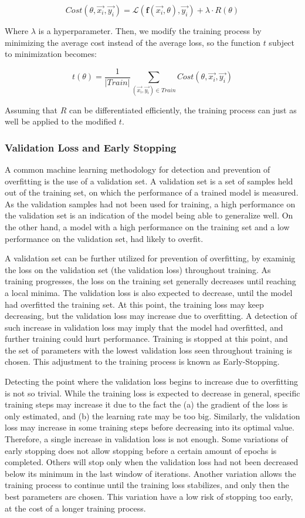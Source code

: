 $$ Cost(\theta, \vec{x_i}, \vec{y_i}) = \mathcal{L}(\textbf{f}(\vec{x_i}, \theta), \vec{y_i}) + \lambda \cdot R(\theta) $$

Where $\lambda$ is a hyperparameter. Then, we modify the training process by minimizing the average cost instead of the average loss, so the function $t$ subject to minimization becomes:

$$ t(\theta) = \frac{1}{|Train|}\sum_{(\vec{x_i}, \vec{y_i}) \in Train} Cost(\theta, \vec{x_i}, \vec{y_i}) $$

Assuming that $R$ can be differentiated efficiently, the training process can just as well be applied to the modified $t$.

\subsubsection{Validation Loss and Early Stopping}

A common machine learning methodology for detection and prevention of overfitting is the use of a validation set. A validation set is a set of samples held out of the training set, on which the performance of a trained model is measured. As the validation samples had not been used for training, a high performance on the validation set is an indication of the model being able to generalize well. On the other hand, a model with a high performance on the training set and a low performance on the validation set, had likely to overfit. 

A validation set can be further utilized for prevention of overfitting, by examinig the loss on the validation set (the validation loss) throughout training. As training progresses, the loss on the training set generally decreases until reaching a local minima. The validation loss is also expected to decrease, until the model had overfitted the training set. At this point, the training loss may keep decreasing, but the validation loss may increase due to overfitting. A detection of such increase in validation loss may imply that the model had overfitted, and further training could hurt performance. Training is stopped at this point, and the set of parameters with the lowest validation loss seen throughout training is chosen. This adjustment to the training process is known as Early-Stopping. 

Detecting the point where the validation loss begins to increase due to overfitting is not so trivial. While the training loss is expected to decrease in general, specific training steps may increase it due to the fact the (a) the gradient of the loss is only estimated, and (b) the learning rate may be too big. Similarly, the validation loss may increase in some training steps before decreasing into its optimal value. Therefore, a single increase in validation loss is not enough. Some variations of early stopping does not allow stopping before a certain amount of epochs is completed. Others will stop only when the validation loss had not been decreased below its minimum in the last window of iterations. Another variation allows the training process to continue until the training loss stabilizes, and only then the best parameters are chosen. This variation have a low risk of stopping too early, at the cost of a longer training process.

